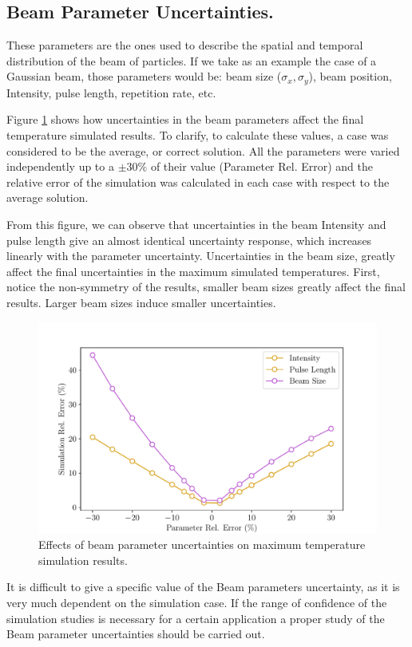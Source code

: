 \subsection{Beam Parameter Uncertainties.}

These parameters are the ones used to describe the spatial and temporal distribution of the beam of particles. If we take as an example the case of a Gaussian beam, those parameters would be: beam size ($\sigma_x , \sigma_y$), beam position, Intensity, pulse length, repetition rate, etc. 

Figure \ref{fig:BeamParUnc} shows how uncertainties in the beam parameters affect the final temperature simulated results. To clarify, to calculate these values, a case was considered to be the average, or correct solution. All the parameters were varied independently up to a $\pm 30\%$ of their value (Parameter Rel. Error)  and the relative error of the simulation was calculated in each case with respect to the average solution. 

From this figure, we can observe that uncertainties in the beam Intensity and pulse length give an almost identical uncertainty response, which increases linearly with the parameter uncertainty. Uncertainties in the beam size, greatly affect the final uncertainties in the maximum simulated temperatures. First, notice the non-symmetry of the results, smaller beam sizes greatly affect the final results. Larger beam sizes induce smaller uncertainties. 

\begin{figure}[h]
    \centering
    \includegraphics[width=0.7\columnwidth]{BeamParameterUncertainty/BeamParUnc.pdf}
    \caption{Effects of beam parameter uncertainties on maximum temperature simulation results.}
    \label{fig:BeamParUnc}
\end{figure}

It is difficult to give a specific value of the Beam parameters uncertainty, as it is very much dependent on the simulation case. If the range of confidence of the simulation studies is necessary for a certain application a proper study of the Beam parameter uncertainties should be carried out. 

